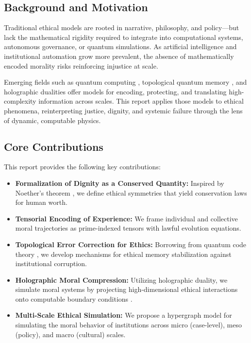 \documentclass[12]{amsart}
\theoremstyle{plain}
\begin{document}
\subsection{Background and Motivation}

Traditional ethical models are rooted in narrative, philosophy, and policy—but lack the mathematical rigidity required to integrate into computational systems, autonomous governance, or quantum simulations. As artificial intelligence and institutional automation grow more prevalent, the absence of mathematically encoded morality risks reinforcing injustice at scale.

Emerging fields such as quantum computing \citep{Nielsen2010}, topological quantum memory \citep{Kitaev2003}, and holographic dualities \citep{Maldacena1998} offer models for encoding, protecting, and translating high-complexity information across scales. This report applies those models to ethical phenomena, reinterpreting justice, dignity, and systemic failure through the lens of dynamic, computable physics.

\subsection{Core Contributions}

This report provides the following key contributions:

\begin{itemize}
    \item \textbf{Formalization of Dignity as a Conserved Quantity:} Inspired by Noether's theorem \citep{Noether1918}, we define ethical symmetries that yield conservation laws for human worth.
    \item \textbf{Tensorial Encoding of Experience:} We frame individual and collective moral trajectories as prime-indexed tensors with lawful evolution equations.
    \item \textbf{Topological Error Correction for Ethics:} Borrowing from quantum code theory \citep{Kitaev2003}, we develop mechanisms for ethical memory stabilization against institutional corruption.
    \item \textbf{Holographic Moral Compression:} Utilizing holographic duality, we simulate moral systems by projecting high-dimensional ethical interactions onto computable boundary conditions \citep{Maldacena1998}.
    \item \textbf{Multi-Scale Ethical Simulation:} We propose a hypergraph model for simulating the moral behavior of institutions across micro (case-level), meso (policy), and macro (cultural) scales.
\end{itemize}
\end{document}
